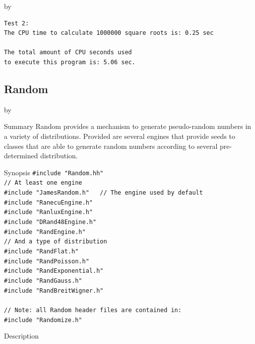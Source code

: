 \documentclass[twoside]{article}
\newcommand{\entrylabel}[1]{\mbox{\textbf{{#1}}}\hfil}%
\newenvironment{entry}
{\begin{list}{}%
    {\renewcommand{\makelabel}{\entrylabel}%
     \setlength{\labelwidth}{90pt}%
     \setlength{\leftmargin}{\labelwidth}
     \advance\leftmargin by \labelsep%
      }%
    }%
  {\end{list}}
\newcommand{\Entrylabel}[1]%
{\raisebox{0pt}[1ex][0pt]{\makebox[\labelwidth][l]%
    {\parbox[t]{\labelwidth}{\hspace{0pt}\textbf{{#1}}}}}}
\newenvironment{Entry}%
{\renewcommand{\entrylabel}{\Entrylabel}\begin{entry}}%
  {\end{entry}}
\begin{document}
\begin{description}
\begin{Entry}
{\begin{verbatim}
Test 2:
The CPU time to calculate 1000000 square roots is: 0.25 sec

The total amount of CPU seconds used 
to execute this program is: 5.06 sec.
\end{verbatim}
}

\end{Entry}

\clearpage

%
%
\subsection{Random } \label{Random}
\begin{Entry}
\item[Summary]
    Random provides a mechanism to generate pseudo-random numbers in
    a variety of distributions.  Provided are several engines
    that provide seeds to classes that are able to generate random
    numbers according to several pre-determined distribution.
    
\item[Synopsis]
    \verb+#include "Random.hh"+\\
    \verb+// At least one engine+\\
    \verb+#include "JamesRandom.h"   // The engine used by default+\\
    \verb+#include "RanecuEngine.h"+\\
    \verb+#include "RanluxEngine.h"+\\
    \verb+#include "DRand48Engine.h"+\\
    \verb+#include "RandEngine.h"+\\
    \verb+// And a type of distribution+\\
    \verb+#include "RandFlat.h"+\\
    \verb+#include "RandPoisson.h"+\\
    \verb+#include "RandExponential.h"+\\
    \verb+#include "RandGauss.h"+\\
    \verb+#include "RandBreitWigner.h"+\\ \\
    \verb+// Note: all Random header files are contained in:+\\
    \verb+#include "Randomize.h"+\\
    
\item[Description]   


\end{Entry}
\end{description}
\end{document}

